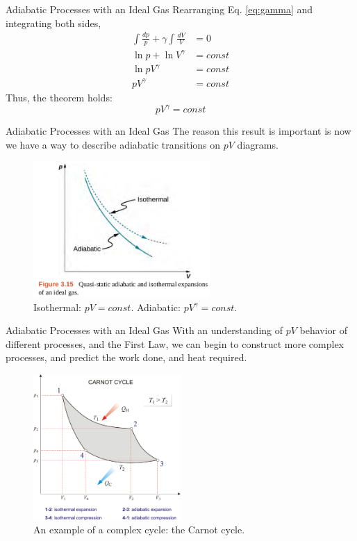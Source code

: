 \documentclass{beamer}
\begin{document}
\begin{frame}{Adiabatic Processes with an Ideal Gas}
Rearranging Eq. \ref{eq:gamma} and integrating both sides,
\begin{align}
\int \frac{dp}{p} + \gamma \int \frac{dV}{V} &= 0 \\
\ln p + \ln V^{\gamma} &= const \\
\ln pV^{\gamma} &= const \\
pV^\gamma &= const
\end{align}
Thus, the theorem holds:
\begin{equation}
\boxed{ pV^\gamma = const}
\end{equation}
\end{frame}

\begin{frame}{Adiabatic Processes with an Ideal Gas}
The reason this result is important is now we have a way to describe adiabatic transitions on $pV$ diagrams.
\begin{figure}
\centering
\includegraphics[width=0.6\textwidth]{figures/adiabatic.png}
\caption{\label{fig:adiabatic} Isothermal: $pV = const$.  Adiabatic: $pV^\gamma = const$.}
\end{figure}
\end{frame}

\begin{frame}{Adiabatic Processes with an Ideal Gas}
\small
With an understanding of $pV$ behavior of different processes, and the First Law, we can begin to construct more complex processes, and predict the work done, and heat required.
\begin{figure}
\centering
\includegraphics[width=0.5\textwidth]{figures/carnot_cycle.png}
\caption{\label{fig:carnot} An example of a complex cycle: the Carnot cycle.}
\end{figure}
\end{frame}
\end{document}

